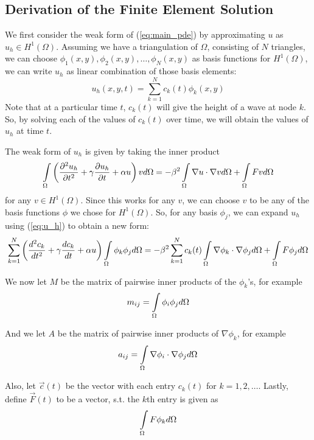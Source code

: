 \subsection{Derivation of the Finite Element Solution}
We first consider the weak form of (\ref{eq:main_pde}) by approximating $u$ as $u_h \in H^1(\Omega)$. Assuming we have
a triangulation of $\Omega$, consisting of $N$ triangles, we can choose 
$\phi_1(x,y), \phi_2(x,y), \ldots, \phi_N(x,y)$ as basis functions for $H^1(\Omega)$, we can write $u_h$ as linear
combination of those basis elements:
\begin{equation} \label{eq:u_h}
u_h(x,y,t) = \sum\limits_{k=1}^N c_k(t) \phi_k(x,y)
\end{equation}
Note that at a particular time $t$, $c_k(t)$ will give the height of a wave at node $k$. So, by solving each of the values
of $c_k(t)$ over time, we will obtain the values of $u_h$ at time $t$.

The weak form of $u_h$ is given by taking the inner product 
\begin{equation} \label{eq:u_h_weak_form}
\int\limits_{\Omega}  \left( \frac{\partial^2 u_h}{\partial t^2} + \gamma \frac{\partial u_h}{\partial t} + \alpha u \right)   v  d\Omega
=
- \beta^2 \int\limits_{\Omega} \nabla u \cdot \nabla v d\Omega
+ \int\limits_{\Omega} F v d\Omega
\end{equation}
for any $v \in H^1(\Omega)$. Since this works for any $v$, we can choose $v$ to be any of the basis functions $\phi$
we chose for $H^1(\Omega)$. So, for any basis $\phi_j$, we can expand $u_h$ using (\ref{eq:u_h}) to obtain a new form:
\begin{equation} \label{eq:u_h_weak_form_expanded}
\sum\limits_{k=1}^N \left( \frac{d^2 c_k}{d t^2} + \gamma\frac{d c_k}{d t} + \alpha u \right) \int\limits_{\Omega} \phi_k \phi_j d\Omega
=
- \beta^2\sum\limits_{k=1}^N c_k(t) \int\limits_{\Omega} \nabla \phi_k \cdot \nabla \phi_j d\Omega
+
\int\limits_{\Omega} F \phi_j d\Omega
\end{equation}

We now let $M$ be the matrix of pairwise inner products of the $\phi_k$'s, for example
\begin{equation} \label{eq:m_definition}
m_{ij} = \int\limits_{\Omega} \phi_i \phi_j d\Omega
\end{equation}

And we let $A$ be the matrix of pairwise inner products of $\nabla \phi_k$, for example
\begin{equation} \label{eq:a_definition}
a_{ij} = \int\limits_{\Omega} \nabla \phi_i \cdot \nabla \phi_j d\Omega
\end{equation}

Also, let $\vec{c}(t)$ be the vector with each entry $c_k(t)$ for $k=1, 2, \ldots$. Lastly, define
$\vec{F}(t)$ to be a vector, s.t. the $k$th entry is given as 
\begin{equation} \label{eq:vec_F_definition}
\int\limits_{\Omega} F \phi_k d\Omega
\end{equation}

